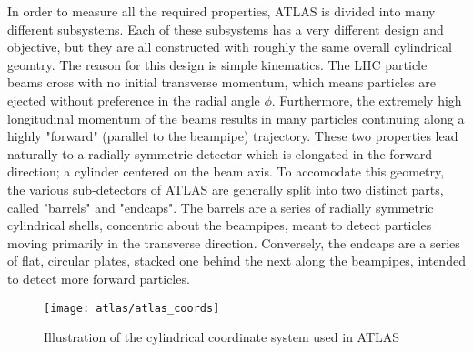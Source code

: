     In order to measure all the required properties, ATLAS is divided into many different subsystems.
    Each of these subsystems has a very different design and objective, but they are all constructed with roughly the same overall cylindrical geomtry.
    The reason for this design is simple kinematics.
    The LHC particle beams cross with no initial transverse momentum, which means particles are ejected without preference in the radial angle $\phi$.
    Furthermore, the extremely high longitudinal momentum of the beams results in many particles continuing along a highly "forward" (parallel to the beampipe) trajectory.
    These two properties lead naturally to a radially symmetric detector which is elongated in the forward direction; a cylinder centered on the beam axis.
    To accomodate this geometry, the various sub-detectors of ATLAS are generally split into two distinct parts, called "barrels" and "endcaps".
    The barrels are a series of radially symmetric cylindrical shells, concentric about the beampipes, meant to detect particles moving primarily in the transverse direction.
    Conversely, the endcaps are a series of flat, circular plates, stacked one behind the next along the beampipes, intended to detect more forward particles.

    \begin{figure}
        \texttt{[image: atlas/atlas\_coords]}
        \caption{Illustration of the cylindrical coordinate system used in ATLAS \cite{Schott:1699952}}
        \label{fig:atlas_coords}
    \end{figure}

